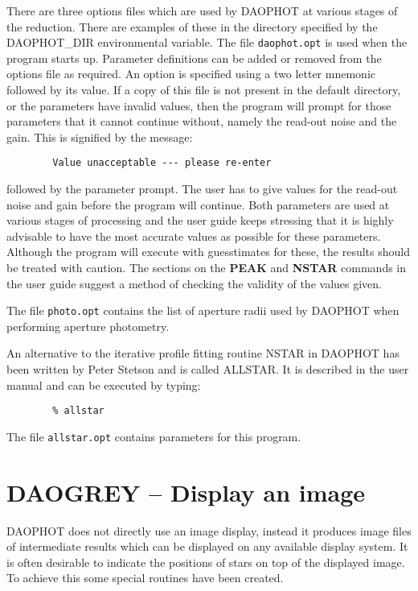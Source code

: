 There are three options files which are used by DAOPHOT at various stages of the
reduction. There are examples of these in the directory specified by the
DAOPHOT\_DIR environmental variable. The file {\tt daophot.opt} is used when the
program starts up. Parameter definitions can be added or removed from the options
file as required. An option is specified using a two letter mnemonic followed by
its value. If a copy of this file is not present in the default directory, or the
parameters have invalid values, then the program will prompt for those parameters
that it cannot continue without, namely the read-out noise and the gain. This is
signified by the message:

\begin{verbatim}
        Value unacceptable --- please re-enter
\end{verbatim}

followed by the parameter prompt. The user has to give values for the read-out
noise and gain before the program will continue. Both parameters are used at
various stages of processing and the user guide keeps stressing that it is highly
advisable to have the most accurate values as possible for these parameters.
Although the program will execute with guesstimates for these, the results should
be treated with caution. The sections on the {\bf PEAK} and {\bf NSTAR} commands in
the user guide suggest a method of checking the validity of the values given.

The file {\tt photo.opt} contains the list of aperture radii used by DAOPHOT when
performing aperture photometry.

An alternative to the iterative profile fitting routine NSTAR in DAOPHOT has been
written by Peter Stetson and is called ALLSTAR. It is described in the user manual
and can be executed by typing:

\begin{verbatim}
        % allstar
\end{verbatim}

The file {\tt allstar.opt} contains parameters for this program.

\section{DAOGREY -- Display an image}
\label{sec:daogrey}

DAOPHOT does not directly use an image display, instead it produces image files of
intermediate results which can be displayed on any available display system. It is
often desirable to indicate the positions of stars on top of the displayed image.
To achieve this some special routines have been created.

